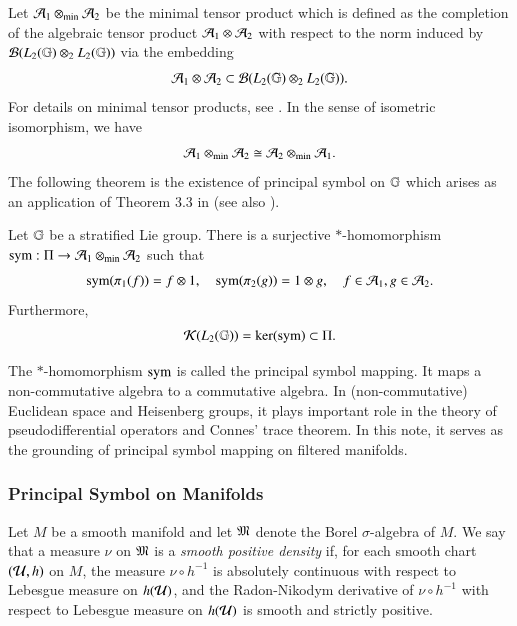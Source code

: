 \documentclass[leqno]{amsart}
\begin{document}
	
	
	
	Let ${\mathcal A}_{1}\otimes_{\rm min}{\mathcal A}_{2}$ be the minimal tensor product which is defined as the completion of the algebraic tensor product ${\mathcal A}_{1}\otimes{\mathcal A}_{2}$ with respect to the norm induced by ${\mathcal B}(L_{2}(\mathbb{G})\otimes_{2}L_{2}(\mathbb{G}))$ via the embedding
	$${\mathcal A}_{1}\otimes{\mathcal A}_{2}\subset{\mathcal B}(L_{2}(\mathbb{G})\otimes_{2}L_{2}(\mathbb{G})).$$
	For details on minimal tensor products, see \cite{T-book2002}.
	In the sense of isometric isomorphism, we have
	$${\mathcal A}_{1}\otimes_{\rm min}{\mathcal A}_{2}\cong{\mathcal A}_{2}\otimes_{\rm min}{\mathcal A}_{1}.$$
	The following theorem is the existence of principal symbol on $\mathbb{G}$ which arises as an application of Theorem 3.3 in \cite{DAO2} (see also \cite[Theorem 5.2.6]{LMSZv2}).
	\begin{theorem}\label{symbol}
		Let $\mathbb{G}$ be a stratified Lie group.
		There is a surjective $*$-homomorphism ${\rm sym}:\Pi\rightarrow{\mathcal A}_{1}\otimes_{\rm min}{\mathcal A}_{2}$ such that
		\begin{align*}
			{\rm sym}(\pi_{1}(f))=f\otimes1,\quad{\rm sym}(\pi_{2}(g))=1\otimes g,\quad f\in{\mathcal A}_{1},g\in{\mathcal A}_{2}.
		\end{align*}
		Furthermore,
		\begin{align*}
			{\mathcal K}(L_{2}(\mathbb{G}))=\ker({\rm sym})\subset\Pi.
		\end{align*}
	\end{theorem}
	The $*$-homomorphism ${\rm sym}$ is called the principal symbol mapping. It maps a non-commutative algebra to a commutative algebra. In (non-commutative) Euclidean space and Heisenberg groups, it plays important role in the theory of pseudodifferential operators and Connes' trace theorem. In this note, it serves as the grounding of principal symbol mapping on filtered manifolds.
	
	
	
	
	
	
	\subsubsection{Principal Symbol on Manifolds}\label{symbol on manifold-section}
	\begin{definition}
		Let $M$ be a smooth manifold and let $\mathfrak M$ denote the Borel $\sigma$-algebra of $M$. We say that a measure $\nu$ on $\mathfrak M$ is a \textit{smooth positive density} if, for each smooth chart $({\mathcal U},h)$ on $M$, the measure $\nu\circ h^{-1}$ is absolutely continuous with respect to Lebesgue measure on $h({\mathcal U})$, and the Radon-Nikodym derivative of $\nu\circ h^{-1}$ with respect to Lebesgue measure on $h({\mathcal U})$ is smooth and strictly positive.
	\end{definition}
	
\end{document}

